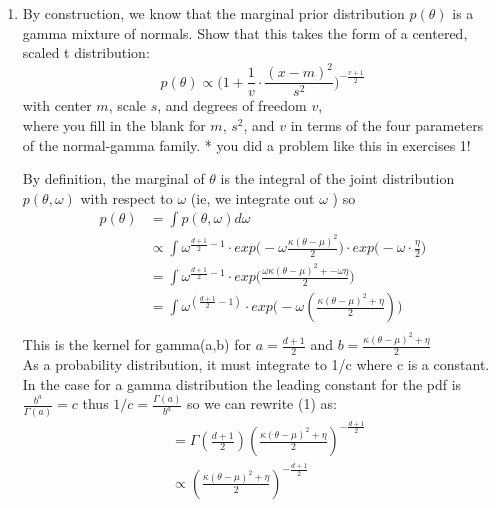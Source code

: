 \documentclass{homework}
\begin{document}
\begin{enumerate}[label=(\Alph*)]
\item By construction, we know that the marginal prior distribution $p(\theta)$ is a gamma mixture of normals. Show that this takes the form of a centered, scaled t distribution:
$$p(\theta) \propto \big( 1 + \frac{1}{v} \cdot \frac{(x-m)^2}{s^2}\big)^{-\frac{v+1}{2}}$$
with center $m$, scale $s$, and degrees of freedom $v$, \\ where you fill in the blank for $m$, $s^2$, and $v$ in terms of the four parameters\\ of the normal-gamma family. * you did a problem like this in exercises 1!\\

\par \noindent By definition, the marginal of $\theta$ is the integral of the joint distribution $p(\theta,\omega)$ with respect to $\omega$ (ie, we integrate out $\omega$ ) so 
\begin{equation} \begin{split}
p(\theta) & = \int p(\theta, \omega) d\omega \\
& \propto \int  \omega^{\frac{d+1}{2} - 1 } \cdot exp\big( -\omega \frac{\kappa(\theta - \mu)^2}{2} \big)  \cdot exp\big( -\omega \cdot \frac{\eta}{2}\big)\\
& = \int \omega^{\frac{d+1}{2} - 1 } \cdot exp\big(  \frac{\omega\kappa(\theta - \mu)^2 + -\omega\eta}{2}\big) \\
& = \int \omega^{( \frac{d+1}{2} - 1) } \cdot exp\big(  - \omega ( \frac{\kappa(\theta - \mu)^2 + \eta}{2} )\big) \\
\end{split} \end{equation}
This is the kernel for gamma(a,b) for $a = \frac{d + 1}{2}$ and $b = \frac{\kappa(\theta - \mu)^2 + \eta}{2} $\\ As a probability distribution, it must integrate to 1/c where c is a constant. \\
In the case for a gamma distribution the leading constant for the pdf is \\$\frac{b^a}{\Gamma(a)} = c$ thus $1/c  =   \frac{\Gamma(a)}{b^a}$ so we can rewrite (1) as:
\begin{equation} \begin{split}
& = \Gamma(\frac{d+1}{2})( \frac{\kappa(\theta - \mu)^2 + \eta}{2} )^{-\frac{d+1}{2}} \\
& \propto ( \frac{\kappa(\theta - \mu)^2 + \eta}{2} )^{-\frac{d+1}{2}} \\

\end{split}
\end{equation}
\end{enumerate}
\end{document}
